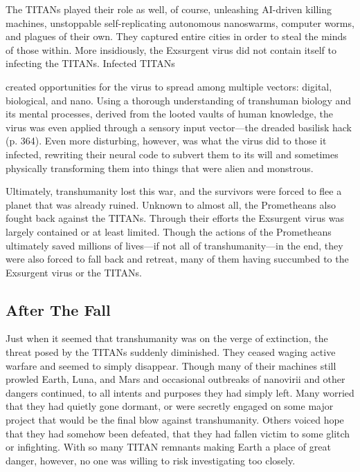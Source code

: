 The TITANs played their role as well, of course, unleashing AI-driven killing machines, unstoppable self-replicating autonomous nanoswarms, computer worms, and plagues of their own. They captured entire cities in order to steal the minds of those within. More insidiously, the Exsurgent virus did not contain itself to infecting the TITANs. Infected TITANs 

created opportunities for the virus to spread among multiple vectors: digital, biological, and nano. Using a thorough understanding of transhuman biology and its mental processes, derived from the looted vaults of human knowledge, the virus was even applied through a sensory input vector—the dreaded basilisk hack (p. 364). Even more disturbing, however, was what the virus did to those it infected, rewriting their neural code to subvert them to its will and sometimes physically transforming them into things that were alien and monstrous. 

Ultimately, transhumanity lost this war, and the survivors were forced to flee a planet that was already ruined. Unknown to almost all, the Prometheans also fought back against the TITANs. Through their efforts the Exsurgent virus was largely contained or at least limited. Though the actions of the Prometheans ultimately saved millions of lives—if not all of transhumanity—in the end, they were also forced to fall back and retreat, many of them having succumbed to the Exsurgent virus or the TITANs. 

\subsection{After The Fall} 

Just when it seemed that transhumanity was on the verge of extinction, the threat posed by the TITANs suddenly diminished. They ceased waging active warfare and seemed to simply disappear. Though many of their machines still prowled Earth, Luna, and Mars and occasional outbreaks of nanovirii and other dangers continued, to all intents and purposes they had simply left. Many worried that they had quietly gone dormant, or were secretly engaged on some major project that would be the final blow against transhumanity. Others voiced hope that they had somehow been defeated, that they had fallen victim to some glitch or infighting. With so many TITAN remnants making Earth a place of great danger, however, no one was willing to risk investigating too closely. 

